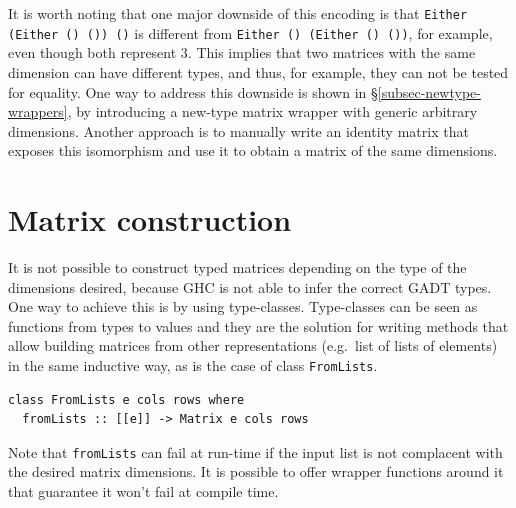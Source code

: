 \documentclass[sigplan,screen]{acmart}\settopmatter{}
\newcommand{\hs}{\texttt}
\def\doc{paper}
\begin{document}
It is worth noting that one major downside of this encoding is that \hs{Either (Either () ()) ()} is different from \hs{Either () (Either () ())}, for example, even though both represent $3$. This implies that two matrices with the same dimension can have different types, and thus, for example, they can not be tested for equality. One way to address this downside is shown in \S\ref{subsec-newtype-wrappers}, by introducing a new-type matrix wrapper with generic arbitrary dimensions. Another approach is to manually write an identity matrix that exposes this isomorphism and use it to obtain a matrix of the same dimensions.  

\section{Matrix construction}\label{l-m-s}

It is not possible to construct typed matrices depending on the type of the dimensions desired, because GHC is not able to infer the correct GADT types. One way to achieve this is by using type-classes. Type-classes can be seen as functions from types to values and they are the solution for writing methods that allow building matrices from other representations (e.g.\ list of lists of elements) in the same inductive way, as is the case of class \hs{FromLists}.
\begin{verbatim}
class FromLists e cols rows where
  fromLists :: [[e]] -> Matrix e cols rows
\end{verbatim}
\noindent %
Note that \hs{fromLists} can fail at run-time if the input list is not complacent with the desired matrix dimensions. It is possible to offer wrapper functions around it that guarantee it won't fail at compile time.
\end{document}
